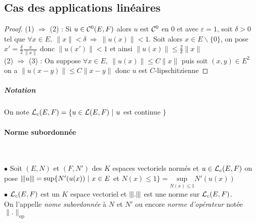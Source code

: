 		 \medskip
		
		 
	\subsection{Cas des applications linéaires}
		
		
		\begin{proof}
		{\small (1)} $\Rightarrow$ {\small (2)} : Si $u\in {\mathcal{C}}^0 (E,F)$ alors $u$ est ${\mathcal{C}}^0$ en $0$ et avec $\varepsilon = 1$, soit $\delta >0$ tel que $\forall x\in E , ~\| x \| < \delta ~\Rightarrow ~\| u(x) \| < 1$. Soit alors $x\in E\backslash \{0\}$, on pose $x' = \frac{\delta}{2}\frac{x}{\| x \|}$ donc $\| u(x' ) \| <1$ et ainsi 
		$\| u(x) \| \leq \frac{2}{\delta} \| x \|$ \medskip \\ 
		{\small (2)} $\Rightarrow$ {\small (3)} : On suppose $\forall x\in E , ~\| u(x) \| \leq C\| x \| $ puis soit $(x,y) \in E^2$ 
		\\ on a $\| u(x-y) \| \leq C \| x-y \|$ donc $u$ est $C$-lipschitzienne
		\end{proof} \medskip
		
		\subparagraph{Notation}
			On note ${\mathcal{L}}_c (E,F) = \{u\in {\mathcal{L}} (E,F) ~|~u$ est continue $\}$ 
		
		\traitd 
		\paragraph{Norme subordonnée} ~ \vspace{5pt} \\
			\hspace*{15pt} {\vrule width 1pt} \kern2pt
			\begin{minipage}{0.9\textwidth}
				$\bullet$ Soit $(E,N)$ et $(F,N' )$ des $K$ espaces vectoriels normés et $u\in {\mathcal{L}}_c (E,F)$ on pose ${\left\vert\kern-0.15ex\left\vert\kern-0.15ex\left\vert u \right\vert\kern-0.15ex\right\vert\kern-0.15ex\right\vert} = \mathrm{sup} \{N' (u(x)) ~|~x\in E$ et $N(x) \leq 1 \} = \underset{N(x)\leq 1}{\mathrm{sup}} N' (u(x))$\\
				$\bullet$ ${\mathcal{L}}_c (E,F)$ est un $K$ espace vectoriel et ${\left\vert\kern-0.15ex\left\vert\kern-0.15ex\left\vert . \right\vert\kern-0.15ex\right\vert\kern-0.15ex\right\vert}$ est une norme sur ${\mathcal{L}}_c (E,F)$. \\ 
				On l'appelle \emph{nome subordonnée} à $N$ et $N'$ ou encore \emph{norme d'opérateur} notée $\| . \|_{\mathrm{op}}$ 
			\end{minipage} ~\\
			
